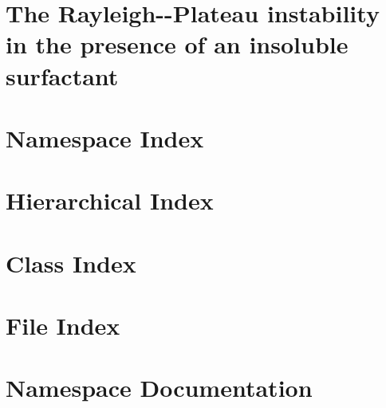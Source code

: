 \documentclass[twoside]{book}
\newcommand{\+}{\discretionary{\mbox{\scriptsize$\hookleftarrow$}}{}{}}
\begin{document}
\hypersetup{pageanchor=false,
             bookmarksnumbered=true,
             pdfencoding=unicode
            }
\hypersetup{pageanchor=true}

\chapter{The Rayleigh-\/-\/\+Plateau instability in the presence of an insoluble surfactant}
\label{index}\hypertarget{index}{}
\chapter{Namespace Index}

\chapter{Hierarchical Index}

\chapter{Class Index}

\chapter{File Index}

\chapter{Namespace Documentation}


\end{document}
